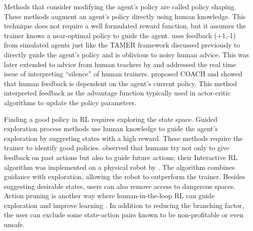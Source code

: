 \documentclass[twoside,11pt]{article}
\begin{document}
Methods that consider modifying the agent's policy are called policy shaping. These methods augment an agent's policy directly using human knowledge. This technique does not require a well formulated reward function, but it assumes the trainer knows a near-optimal policy to guide the agent. \cite{griffith2013policy} uses feedback (+1,-1) from simulated agents just like the TAMER framework discussed previously to directly guide the agent’s policy and is oblivious to noisy human advice. This was later extended to advice from human teachers by \cite{cederborg2015policy} and addressed the real time issue of interpreting “silence” of human trainers. \cite{macglashan2017interactive} proposed COACH and showed that human feedback is dependent on the agent’s current policy. This method interpreted feedback as the advantage function typically used in actor-critic algorithms to update the policy parameters.

Finding a good policy in RL requires exploring the state space. Guided exploration process methods use human knowledge to guide the agent's exploration by suggesting states with a high reward. These methods require the trainer to identify good policies. \cite{Thomaz:2006:RLWithHumanTeachers} observed that humans try not only to give feedback on past actions but also to guide future actions; their Interactive RL algorithm was implemented on a physical robot by \cite{suay:11}. The algorithm combines guidance with exploration, allowing the robot to outperform the trainer. Besides suggesting desirable states, users can also remove access to dangerous spaces. Action pruning is another way where human-in-the-loop RL can guide exploration and improve learning \citep{Abel:2017:AgentAgnosticHumanInTheLoopRL}. In addition to reducing the branching factor, the user can exclude some state-action pairs known to be non-profitable or even unsafe.
\end{document}
